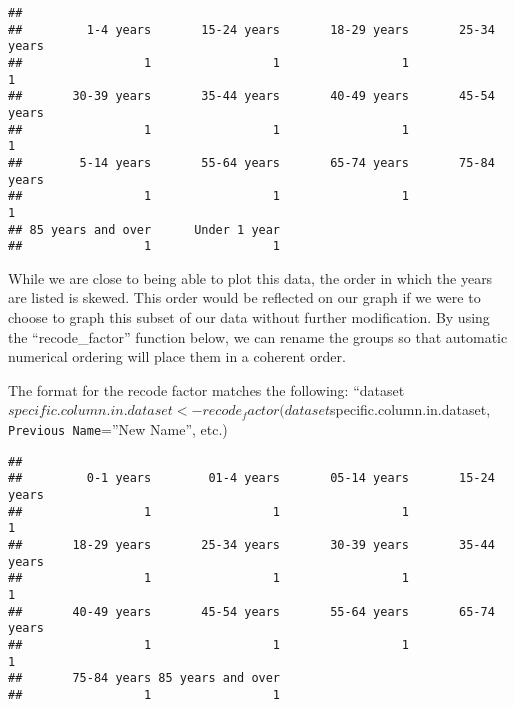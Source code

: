 \documentclass[
]{article}
\newenvironment{Shaded}{\begin{snugshade}}{\end{snugshade}}
\newcommand{\AttributeTok}[1]{\textcolor[rgb]{0.77,0.63,0.00}{#1}}
\newcommand{\FunctionTok}[1]{\textcolor[rgb]{0.00,0.00,0.00}{#1}}
\newcommand{\NormalTok}[1]{#1}
\newcommand{\OtherTok}[1]{\textcolor[rgb]{0.56,0.35,0.01}{#1}}
\newcommand{\SpecialCharTok}[1]{\textcolor[rgb]{0.00,0.00,0.00}{#1}}
\newcommand{\StringTok}[1]{\textcolor[rgb]{0.31,0.60,0.02}{#1}}
\begin{document}
\begin{verbatim}
## 
##         1-4 years       15-24 years       18-29 years       25-34 years 
##                 1                 1                 1                 1 
##       30-39 years       35-44 years       40-49 years       45-54 years 
##                 1                 1                 1                 1 
##        5-14 years       55-64 years       65-74 years       75-84 years 
##                 1                 1                 1                 1 
## 85 years and over      Under 1 year 
##                 1                 1
\end{verbatim}

While we are close to being able to plot this data, the order in which
the years are listed is skewed. This order would be reflected on our
graph if we were to choose to graph this subset of our data without
further modification. By using the ``recode\_factor'' function below, we
can rename the groups so that automatic numerical ordering will place
them in a coherent order.

The format for the recode factor matches the following:
``dataset\(specific.column.in.dataset<-recode_factor(dataset\)specific.column.in.dataset,
\texttt{Previous\ Name}=''New Name'', etc.)

\begin{Shaded}
\end{Shaded}

\begin{verbatim}
## 
##         0-1 years        01-4 years       05-14 years       15-24 years 
##                 1                 1                 1                 1 
##       18-29 years       25-34 years       30-39 years       35-44 years 
##                 1                 1                 1                 1 
##       40-49 years       45-54 years       55-64 years       65-74 years 
##                 1                 1                 1                 1 
##       75-84 years 85 years and over 
##                 1                 1
\end{verbatim}
\end{document}
